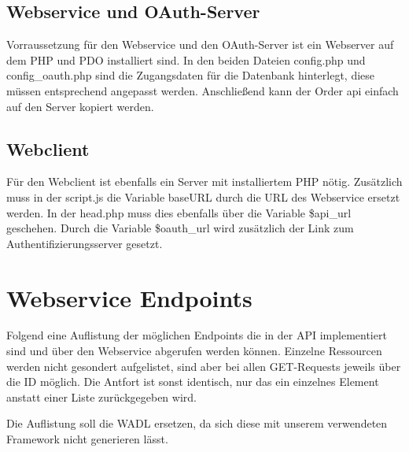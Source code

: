 \section{Webservice und OAuth-Server}
Vorraussetzung für den Webservice und den OAuth-Server ist ein Webserver auf dem PHP und PDO installiert sind. In den beiden Dateien config.php und config\_oauth.php sind die Zugangsdaten für die Datenbank hinterlegt, diese müssen entsprechend angepasst werden. Anschließend kann der Order api einfach auf den Server kopiert werden. 
\section{Webclient}
Für den Webclient ist ebenfalls ein Server mit installiertem PHP nötig. Zusätzlich muss in der script.js die Variable baseURL durch die URL des Webservice ersetzt werden. In der head.php muss dies ebenfalls über die Variable \$api\_url geschehen. Durch die Variable \$oauth\_url wird zusätzlich der Link zum Authentifizierungsserver gesetzt.

\chapter{Webservice Endpoints}

Folgend eine Auflistung der möglichen Endpoints die in der API implementiert sind und über den Webservice abgerufen werden können. Einzelne Ressourcen werden nicht gesondert aufgelistet, sind aber bei allen GET-Requests jeweils über die ID möglich. Die Antfort ist sonst identisch, nur das ein einzelnes Element anstatt einer Liste zurückgegeben wird.

Die Auflistung soll die WADL ersetzen, da sich diese mit unserem verwendeten Framework nicht generieren lässt.

